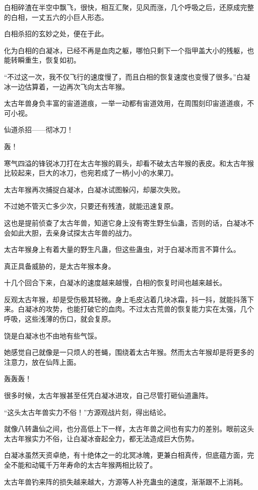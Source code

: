 \begin{this_body}
白相碎渣在半空中飘飞，很快，相互汇聚，见风而涨，几个呼吸之后，还原成完整的白相，一丈五六的小巨人形态。

白相杀招的玄妙之处，便在于此。

化为白相的白凝冰，已经不再是血肉之躯，哪怕只剩下一个指甲盖大小的残躯，也能转瞬重生，恢复如初。

“不过这一次，我不仅飞行的速度慢了，而且白相的恢复速度也变慢了很多。”白凝冰一边估算着，一边再次飞向太古年猴。

太古年兽身负丰富的宙道道痕，一举一动都有宙道效用，在周围刻印宙道道痕，不可小视。

仙道杀招——彻冰刀！

轰！

寒气四溢的锋锐冰刀打在太古年猴的肩头，却看不破太古年猴的表皮。和太古年猴比较起来，巨大的冰刀，也宛若成了一柄小小的水果刀。

太古年猴再次捕捉白凝冰，白凝冰试图躲闪，却屡次失败。

不过她不管灭亡多少次，只要还有残渣，就能迅速复原。

这也是提前侦查了太古年兽，知道它身上没有寄生野生仙蛊，否则的话，白凝冰不会如此大胆，去亲身试探太古年兽的战力。

太古年猴身上有着大量的野生凡蛊，但这些蛊虫，对于白凝冰而言不算什么。

真正具备威胁的，是太古年猴本身。

十几个回合下来，白凝冰的速度越来越慢，白相的恢复时间也越来越长。

反观太古年猴，却是受伤极其轻微。身上毛皮沾着几块冰霜，抖一抖，就能抖落下来。白凝冰的攻势，也能打破它的血肉。不过太古荒兽的恢复能力实在太强，几个呼吸，这些浅薄的伤口，就会复原。

饶是白凝冰也不由地有些气馁。

她感觉自己就像是一只烦人的苍蝇，围绕着太古年猴。然而太古年猴却是将更多的注意力，放在仙阵上面。

轰轰轰！

很多时候，太古年猴甚至任凭白凝冰进攻，自己尽管打砸仙道蛊阵。

“这头太古年兽实力不俗！”方源观战片刻，得出结论。

就像八转蛊仙之间，也分高低上下一样，太古年兽之间也有实力的差别。眼前这头太古年猴实力不俗，让白凝冰奋起全力，都无法造成巨大伤势。

白凝冰虽然天资卓绝，有十绝体之一的北冥冰魄，更兼白相真传，但底蕴方面，完全不能和动辄千万年寿命的太古年猴两相比较了。

太古年兽钓来阵的损失越来越大，方源等人补充蛊虫的速度，渐渐跟不上消耗。


\end{this_body}
